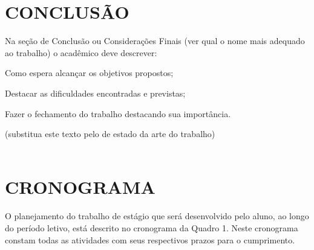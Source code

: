  
{\let\clearpage\relax \chapter{CONCLUSÃO}} %
\label{chap:conclusao}
Na seção de Conclusão ou Considerações Finais (ver qual o nome mais adequado ao trabalho) o acadêmico deve descrever:

Como espera alcançar os objetivos propostos;

Destacar as dificuldades encontradas e previstas;

Fazer o fechamento do trabalho destacando sua importância.

(substitua este texto pelo de estado da arte do trabalho)
 \\ \\
 
 
{\let\clearpage\relax \chapter{CRONOGRAMA}}
\label{chap:cronograma}

O planejamento do trabalho de estágio que será desenvolvido pelo aluno, ao longo do período letivo, está descrito no cronograma da Quadro 1. Neste cronograma constam todas as atividades com seus respectivos prazos para o cumprimento.

